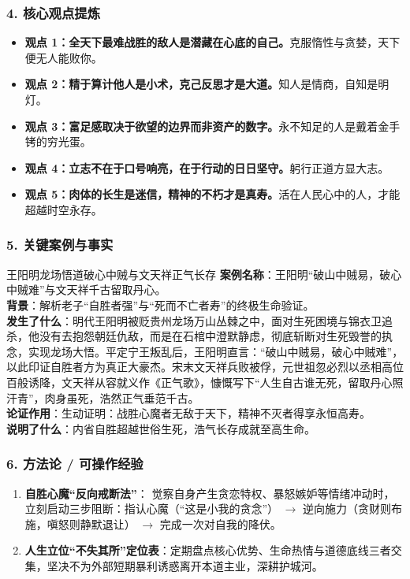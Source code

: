 \subsubsection{4. 核心观点提炼}
\begin{itemize}
    \item \textbf{观点 1：全天下最难战胜的敌人是潜藏在心底的自己。}克服惰性与贪婪，天下便无人能败你。
    \item \textbf{观点 2：精于算计他人是小术，克己反思才是大道。}知人是情商，自知是明灯。
    \item \textbf{观点 3：富足感取决于欲望的边界而非资产的数字。}永不知足的人是戴着金手铐的穷光蛋。
    \item \textbf{观点 4：立志不在于口号响亮，在于行动的日日坚守。}躬行正道方显大志。
    \item \textbf{观点 5：肉体的长生是迷信，精神的不朽才是真寿。}活在人民心中的人，才能超越时空永存。
\end{itemize}

\subsubsection{5. 关键案例与事实}
\begin{CaseBox}{王阳明龙场悟道破心中贼与文天祥正气长存}
\textbf{案例名称}：王阳明“破山中贼易，破心中贼难”与文天祥千古留取丹心。\\
\textbf{背景}：解析老子“自胜者强”与“死而不亡者寿”的终极生命验证。\\
\textbf{发生了什么}：明代王阳明被贬贵州龙场万山丛棘之中，面对生死困境与锦衣卫追杀，他没有去抱怨朝廷仇敌，而是在石棺中澄默静虑，彻底斩断对生死毁誉的执念，实现龙场大悟。平定宁王叛乱后，王阳明直言：“破山中贼易，破心中贼难”，以此印证自胜者方为真正大豪杰。宋末文天祥兵败被俘，元世祖忽必烈以丞相高位百般诱降，文天祥从容就义作《正气歌》，慷慨写下“人生自古谁无死，留取丹心照汗青”，肉身虽死，浩然正气垂范千古。\\
\textbf{论证作用}：生动证明：战胜心魔者无敌于天下，精神不灭者得享永恒高寿。\\
\textbf{说明了什么}：内省自胜超越世俗生死，浩气长存成就至高生命。
\end{CaseBox}

\subsubsection{6. 方法论 / 可操作经验}
\begin{enumerate}
    \item \textbf{自胜心魔“反向戒断法”}：
    觉察自身产生贪恋特权、暴怒嫉妒等情绪冲动时，立刻启动三步阻断：指认心魔（“这是小我的贪念”） $\rightarrow$ 逆向施力（贪财则布施，嗔怒则静默退让） $\rightarrow$ 完成一次对自我的降伏。
    \item \textbf{人生立位“不失其所”定位表}：定期盘点核心优势、生命热情与道德底线三者交集，坚决不为外部短期暴利诱惑离开本道主业，深耕护城河。
\end{enumerate}

